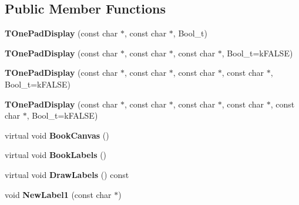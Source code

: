 \subsection*{Public Member Functions}
\begin{DoxyCompactItemize}
\item 
\hypertarget{classTOnePadDisplay_ac4698b487120d3cc19333e418f9ed5ef}{{\bfseries T\-One\-Pad\-Display} (const char $\ast$, const char $\ast$, Bool\-\_\-t)}\label{classTOnePadDisplay_ac4698b487120d3cc19333e418f9ed5ef}

\item 
\hypertarget{classTOnePadDisplay_aa1549f4bfda3b79288aa15a146f5b6bd}{{\bfseries T\-One\-Pad\-Display} (const char $\ast$, const char $\ast$, const char $\ast$, Bool\-\_\-t=k\-F\-A\-L\-S\-E)}\label{classTOnePadDisplay_aa1549f4bfda3b79288aa15a146f5b6bd}

\item 
\hypertarget{classTOnePadDisplay_a2bd8c7bf8f7d8f4f394636f2f34a3880}{{\bfseries T\-One\-Pad\-Display} (const char $\ast$, const char $\ast$, const char $\ast$, const char $\ast$, Bool\-\_\-t=k\-F\-A\-L\-S\-E)}\label{classTOnePadDisplay_a2bd8c7bf8f7d8f4f394636f2f34a3880}

\item 
\hypertarget{classTOnePadDisplay_adb284bc04ff0c076596233e2a215a306}{{\bfseries T\-One\-Pad\-Display} (const char $\ast$, const char $\ast$, const char $\ast$, const char $\ast$, const char $\ast$, Bool\-\_\-t=k\-F\-A\-L\-S\-E)}\label{classTOnePadDisplay_adb284bc04ff0c076596233e2a215a306}

\item 
\hypertarget{classTOnePadDisplay_a14f1ce07e99ba8d65c3159553c09b58d}{virtual void {\bfseries Book\-Canvas} ()}\label{classTOnePadDisplay_a14f1ce07e99ba8d65c3159553c09b58d}

\item 
\hypertarget{classTOnePadDisplay_a6d5a9a8d111ce71d8cb179397232da74}{virtual void {\bfseries Book\-Labels} ()}\label{classTOnePadDisplay_a6d5a9a8d111ce71d8cb179397232da74}

\item 
\hypertarget{classTOnePadDisplay_aaee4e747af685932e2886d9f2773c854}{virtual void {\bfseries Draw\-Labels} () const }\label{classTOnePadDisplay_aaee4e747af685932e2886d9f2773c854}

\item 
\hypertarget{classTOnePadDisplay_ab057c6d5c7a6616cbf2de141ff438ced}{void {\bfseries New\-Label1} (const char $\ast$)}\label{classTOnePadDisplay_ab057c6d5c7a6616cbf2de141ff438ced}


\end{DoxyCompactItemize}
